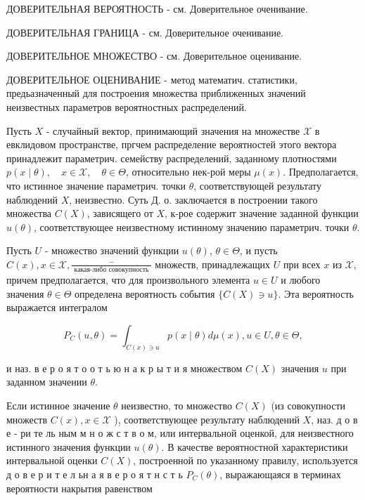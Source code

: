 \documentclass[10pt]{article}
\begin{document}
ДОВЕРИТЕЛЬНАЯ ВЕРОЯТНОСТЬ - см. Доверительное оченивание.



ДОВЕРИТЕЛЬНАЯ ГРАНИЦА - см. Доверительное оченивание.



ДОВЕРИТЕЛЬНОЕ МНОЖЕСТВО - см. Доверительное оценивание.



ДОВЕРИТЕЛЬНОЕ ОЦЕНИВАНИЕ - метод математич. статистики, предьазначенный для построения множества приближенных значений неизвестных параметров вероятностных распределений.



Пусть $X$ - случайный вектор, принимающий значения на множестве $\mathscr{X}$ в евклидовом пространстве, пргчем распределение вероятностей этого вектора принадлежит параметрич. семейству распределений, заданному плотностями $p(x \mid \theta), \quad x \in \mathscr{X}, \quad \theta \in \Theta$, относительно нек-рой меры $\mu(x)$. Предполагается, что истинное значение параметрич. точки $\theta$, соответствующей результату наблюдений $X$, неизвестно. Суть Д. о. заключается в построении такого множества $C(X)$, зависящего от $X$, к-рое содержит значение заданной функции $u(\theta)$, соответствующее неизвестному истинному значению параметрич. точки $\theta$.



Пусть $U$ - множество значений функции $u(\theta)$, $\theta \in \Theta$, и пусть $C(x), x \in \mathscr{X}, \frac{-}{\text { какая-либо совокупность }}$ множеств, принадлежащих $U$ при всех $x$ из $\mathscr{X}$, причем предполагается, что для произвольного элемента $u \in U$ и любого значения $\theta \in \Theta$ определена вероятность события $\{C(X) \ni u\}$. Эта вероятность выражается интегралом



\[

P_{C}(u, \theta)=\int_{C(x) \ni u} p(x \mid \theta) d \mu(x), u \in U, \theta \in \Theta,

\]



и наз. в е р о я т о о т ь ю н а к р ы т и я множеством $C(X)$ значения $u$ при заданном значении $\theta$.



Если истинное значение $\theta$ неизвестно, то множество $C(X)$ (из совокупности множеств $C(x), x \in \mathscr{X}$ ), соответствующее результату наблюдений $X$, наз. д о в е - ри те ль ным м н о ж с т в о м, или интервальной оценкой, для неизвестного истинного значения функции $u(\theta)$. В качестве вероятностной характеристики интервальной оценки $C(X)$, построенной по указанному правилу, используется д о в е р и т е л ьн а я в е р о я т н с т ь $P_{C}(\theta)$, выражающаяся в терминах вероятности накрытия равенством
\end{document}
